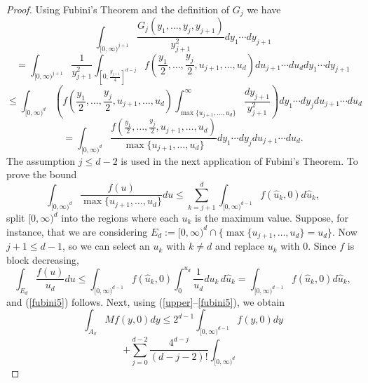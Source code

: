 \documentclass[12pt]{amsart}
\numberwithin{equation}{section}
\theoremstyle{plain}
\theoremstyle{definition}
\theoremstyle{remark}
\begin{document}
\begin{proof}
Using Fubini's Theorem and the definition of $G_j$ we have
\begin{equation}\label{fubini}
\int_{[0,\infty)^{j+1}}
  \frac{G_j(y_1,\ldots,y_j,y_{j+1})}{y_{j+1}^2}dy_1\cdots dy_{j+1}
\end{equation}
\begin{equation} \label{fubini2}
=
\int_{[0,\infty)^{j+1}}
  \frac{1}{y_{j+1}^2}\int_{\left[0,\frac{y_{j+1}}{4}\right]^{d-j}}f\left(\frac{y_1}{2},\ldots,\frac{y_j}{2},u_{j+1},\ldots,u_{d}\right)
  du_{j+1}\cdots
  du_d dy_1\cdots dy_{j+1}
 \end{equation}
 \begin{equation} \label{fubini3}
\le
\int_{[0,\infty)^{d}}
 \left(f\left(\frac{y_1}{2},\ldots,\frac{y_j}{2},u_{j+1},\ldots, u_{d}\right) \int_{\max\{u_{j+1},\ldots, u_{d}\}}^\infty \frac{dy_{j+1}}{y_{j+1}^2}\right)
 dy_1\cdots dy_{j} du_{j+1}\cdots
  du_d
 \end{equation}
 \begin{equation} \label{fubini4}
=
\int_{[0,\infty)^{d}} \frac{f(\frac{y_1}{2},\ldots,\frac{y_j}{2},u_{j+1},\ldots,u_{d})}{\max\{u_{j+1},\ldots,u_d\}}
 dy_1\cdots dy_{j} du_{j+1}\cdots
  du_d.
 \end{equation}
 The assumption $j\le d -2$ is used in the next application
 of Fubini's Theorem. To prove the bound
 \begin{equation}\label{fubini5}
\int_{[0,\infty)^d}
  \frac{f(u)}{\max\{u_{j+1},\ldots,u_d\}}
   du\le
\sum_{k=j+1}^d\int_{[0,\infty)^{d-1}}f(\hat{u}_k,0)
   d\hat{u}_k,
\end{equation}
split $[0,\infty)^d$ into the regions  where each
$u_k$ is the maximum value. Suppose, for instance,
that we are considering
$E_d := [0,\infty)^d\cap \{\max\{u_{j+1},\ldots,u_d\} = u_d\}$.
Now $j + 1\le d - 1$, so we can select an $u_k$ with $k\ne d$
and replace $u_k$ with $0$. Since $f$ is block decreasing,
\begin{equation*}
\int_{E_d}
  \frac{f(u)}{u_d}
   du\le
\int_{[0,\infty)^{d-1}}f(\hat{u}_k,0)\int_0^{u_d} \frac{1}{u_d} d u_k \,
   d\hat{u}_k = \int_{[0,\infty)^{d-1}}f(\hat{u}_k,0)
   d\hat{u}_k,
\end{equation*}
and (\ref{fubini5}) follows.
Next, using (\ref{upper}--\ref{fubini5}), we obtain
\begin{equation*}
  \int_{A_\sigma}Mf(y,0)dy \le 2^{d-1}
  \int_{[0,\infty)^{d-1}}f(y,0)dy
\end{equation*}
\begin{equation*}
 + \sum_{j=0}^{d-2}\frac{4^{d-j}}{(d-j-2)!}\int_{[0,\infty)^d}

\end{equation*}
\end{proof}
\end{document}

